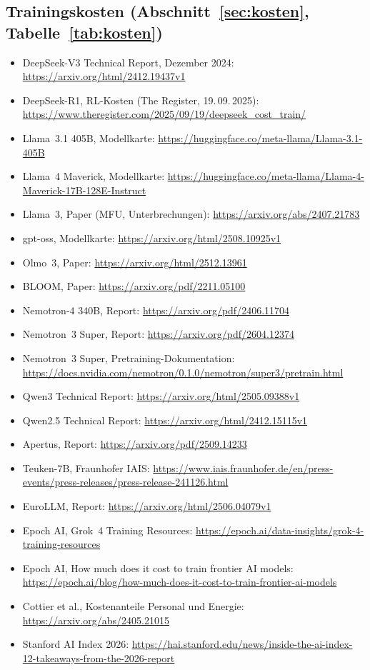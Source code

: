 \documentclass[a4paper,11pt]{article}
\begin{document}
{\subsection*{Trainingskosten (Abschnitt~\ref{sec:kosten}, Tabelle~\ref{tab:kosten})}
\begin{itemize}[itemsep=0.1em]
  \item DeepSeek-V3 Technical Report, Dezember 2024:
    \url{https://arxiv.org/html/2412.19437v1}
  \item DeepSeek-R1, RL-Kosten (The Register, 19.\,09.\,2025):
    \url{https://www.theregister.com/2025/09/19/deepseek_cost_train/}
  \item Llama~3.1 405B, Modellkarte:
    \url{https://huggingface.co/meta-llama/Llama-3.1-405B}
  \item Llama~4 Maverick, Modellkarte:
    \url{https://huggingface.co/meta-llama/Llama-4-Maverick-17B-128E-Instruct}
  \item Llama~3, Paper (MFU, Unterbrechungen):
    \url{https://arxiv.org/abs/2407.21783}
  \item gpt-oss, Modellkarte: \url{https://arxiv.org/html/2508.10925v1}
  \item Olmo~3, Paper: \url{https://arxiv.org/html/2512.13961}
  \item BLOOM, Paper: \url{https://arxiv.org/pdf/2211.05100}
  \item Nemotron-4 340B, Report: \url{https://arxiv.org/pdf/2406.11704}
  \item Nemotron~3 Super, Report: \url{https://arxiv.org/pdf/2604.12374}
  \item Nemotron~3 Super, Pretraining-Dokumentation:
    \url{https://docs.nvidia.com/nemotron/0.1.0/nemotron/super3/pretrain.html}
  \item Qwen3 Technical Report: \url{https://arxiv.org/html/2505.09388v1}
  \item Qwen2.5 Technical Report: \url{https://arxiv.org/html/2412.15115v1}
  \item Apertus, Report: \url{https://arxiv.org/pdf/2509.14233}
  \item Teuken-7B, Fraunhofer IAIS:
    \url{https://www.iais.fraunhofer.de/en/press-events/press-releases/press-release-241126.html}
  \item EuroLLM, Report: \url{https://arxiv.org/html/2506.04079v1}
  \item Epoch AI, Grok~4 Training Resources:
    \url{https://epoch.ai/data-insights/grok-4-training-resources}
  \item Epoch AI, How much does it cost to train frontier AI models:
    \url{https://epoch.ai/blog/how-much-does-it-cost-to-train-frontier-ai-models}
  \item Cottier et al., Kostenanteile Personal und Energie:
    \url{https://arxiv.org/abs/2405.21015}
  \item Stanford AI Index 2026:
    \url{https://hai.stanford.edu/news/inside-the-ai-index-12-takeaways-from-the-2026-report}
\end{itemize}

}
\end{document}
